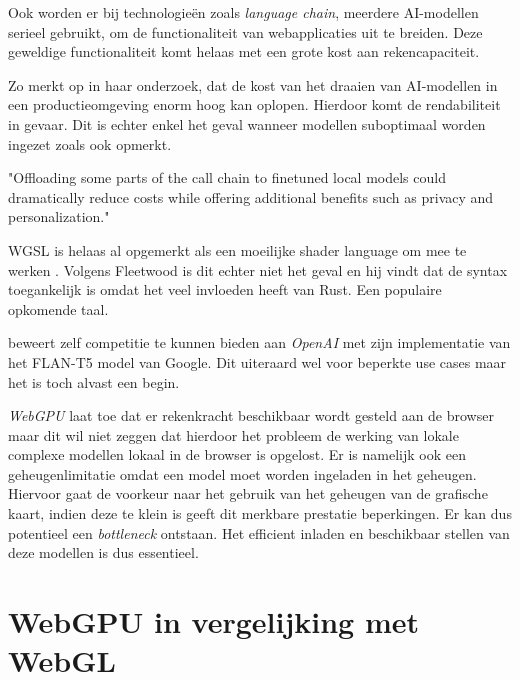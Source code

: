 \bigbreak{}

Ook worden er bij technologieën zoals \textit{language chain}, meerdere AI-mo\-de\-llen serieel gebruikt, om de functionaliteit van webapplicaties uit te breiden. Deze geweldige functionaliteit komt helaas met een grote kost aan rekencapaciteit.

\bigbreak{}

Zo merkt \textcite{Huyen2023} op in haar onderzoek, dat de kost van het draaien van AI-modellen in een productieomgeving enorm hoog kan oplopen. Hierdoor komt de rendabiliteit in gevaar. Dit is echter enkel het geval wanneer modellen suboptimaal worden ingezet zoals \textcite{Fleetwood2023a} ook opmerkt.

\begin{displayquote}
    "Offloading some parts of the call chain to finetuned local models could dramatically reduce costs while offering additional benefits such as privacy and personalization."
\end{displayquote}

\bigbreak{}

WGSL is helaas al opgemerkt als een moeilijke shader language om mee te werken \textcite{Madrigal2023}. Volgens Fleetwood is dit echter niet het geval en hij vindt dat de syntax toegankelijk is omdat het veel invloeden heeft van Rust. Een populaire opkomende taal.

\bigbreak{}

\textcite{Fleetwood2023a} beweert zelf competitie te kunnen bieden aan \textit{OpenAI} met zijn implementatie van het FLAN-T5 model van Google. Dit uiteraard wel voor beperkte use cases maar het is toch alvast een begin.

\textit{WebGPU} laat toe dat er rekenkracht beschikbaar wordt gesteld aan de browser maar dit wil niet zeggen dat hierdoor het probleem de werking van lokale complexe modellen lokaal in de browser is opgelost. Er is namelijk ook een geheugenlimitatie omdat een model moet worden ingeladen in het geheugen. Hiervoor gaat de voorkeur naar het gebruik van het geheugen van de grafische kaart, indien deze te klein is geeft dit merkbare prestatie beperkingen. Er kan dus potentieel een \textit{bottleneck} ontstaan. Het efficient inladen en beschikbaar stellen van deze modellen is dus essentieel.

\break{}

\section{WebGPU in vergelijking met WebGL}

